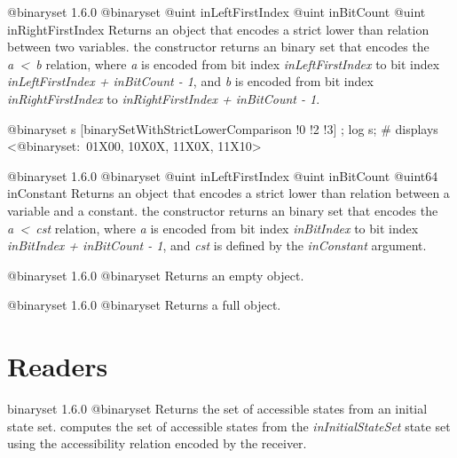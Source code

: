 {@binaryset}
{1.6.0}
{@binaryset}
{@uint inLeftFirstIndex}
{@uint inBitCount}
{@uint inRightFirstIndex}
{Returns an  object that encodes a strict lower than relation between two variables.}
{the constructor returns an binary set that encodes the \emph{a~<~b} relation, where \emph{a} is encoded from bit index \emph{inLeftFirstIndex} to bit index \emph{inLeftFirstIndex  + inBitCount - 1}, and \emph{b} is encoded from bit index \emph{inRightFirstIndex} to \emph{inRightFirstIndex + inBitCount - 1}.}

\exempleDeuxLignes
{}
{@binaryset s [binarySetWithStrictLowerComparison !0 !2 !3] ;}
{log s; \# displays <@binaryset:~01X00, 10X0X, 11X0X, 11X10>}





{@binaryset}
{1.6.0}
{@binaryset}
{@uint inLeftFirstIndex}
{@uint inBitCount}
{@uint64 inConstant}
{Returns an  object that encodes a strict lower than relation between a variable and a constant.}
{the constructor returns an binary set that encodes the \emph{a~<~cst} relation, where \emph {a} is encoded from bit index \emph{inBitIndex} to bit index \emph{inBitIndex  + inBitCount - 1}, and \emph{cst} is defined by the \emph{inConstant} argument.}





{@binaryset}
{1.6.0}
{@binaryset}
{Returns an empty  object.}
{}





{@binaryset}
{1.6.0}
{@binaryset}
{Returns a full  object.}
{}


\section{Readers}



{binaryset}
{1.6.0}
{@binaryset}
{Returns the set of accessible states from an initial state set.}
{computes the set of accessible states from the \emph{inInitialStateSet} state set using the accessibility relation encoded by the receiver.}

